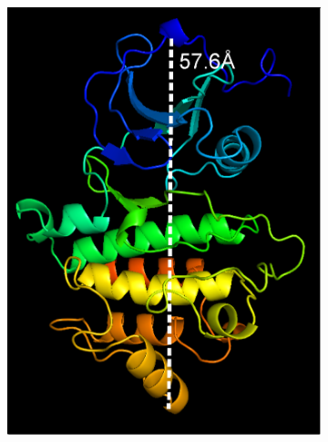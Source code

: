 \documentclass[../AdvancementSummary.tex]{subfiles}
\begin{document}
\begin{figure}[H]
\begin{center}
\begin{subfigure}{0.4\linewidth}
\includegraphics[width=\linewidth]{LckPyMol/Diagonal.eps}
\caption{}
\end{subfigure}
\begin{subfigure}{0.4\linewidth}

\end{subfigure}
\end{center}
\end{figure}
\end{document}
